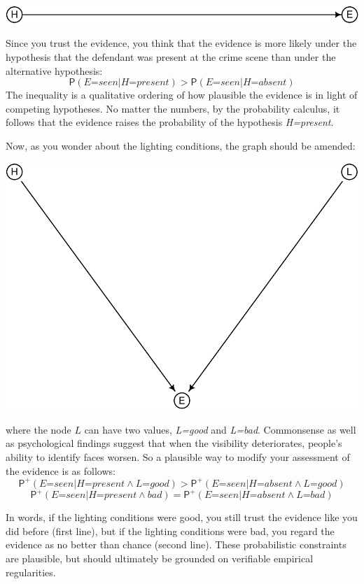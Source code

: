 \documentclass[
  11pt,
  dvipsnames,enabledeprecatedfontcommands]{scrartcl}
\newcommand{\pr}[1]{\ensuremath{\mathsf{P}(#1)}}
\newcommand{\ppr}[2]{\ensuremath{\mathsf{P}^{#1}(#2)}}
\begin{document}
\begin{center}\includegraphics[width=0.5\linewidth,height=0.5\textheight]{ReplyToSteeleStefansson5_files/figure-latex/heDAG-1} \end{center}

\noindent Since you trust the evidence, you think that the evidence is
more likely under the hypothesis that the defendant was present at the
crime scene than under the alternative hypothesis:
\[\pr{\textit{E=seen} \vert \textit{H=present}} > \pr{\textit{E=seen} \vert \textit{H=absent}}\]
The inequality is a qualitative ordering of how plausible the evidence
is in light of competing hypotheses. No matter the numbers, by the
probability calculus, it follows that the evidence raises the
probability of the hypothesis \textit{H=present}.

Now, as you wonder about the lighting conditions, the graph should be
amended:

\begin{center}\includegraphics[width=0.5\linewidth,height=0.3\textheight]{ReplyToSteeleStefansson5_files/figure-latex/lighting2DAG-1} \end{center}

\noindent where the node \(L\) can have two values, \textit{L=good} and
\textit{L=bad}. Commonsense as well as psychological findings suggest
that when the visibility deteriorates, people's ability to identify
faces worsen. So a plausible way to modify your assessment of the
evidence is as follows:
\[\ppr{+}{\textit{E=seen} \vert \textit{H=present} \wedge \textit{L=good}} > \ppr{+}{\textit{E=seen} \vert \textit{H=absent} \wedge \textit{L=good}}\]
\[\ppr{+}{\textit{E=seen} \vert \textit{H=present} \wedge \textit{bad}} = \ppr{+}{\textit{E=seen} \vert \textit{H=absent} \wedge \textit{L=bad}}\]

\noindent In words, if the lighting conditions were good, you still
trust the evidence like you did before (first line), but if the lighting
conditions were bad, you regard the evidence as no better than chance
(second line). These probabilistic constraints are plausible, but should
ultimately be grounded on verifiable empirical regularities.
\end{document}
